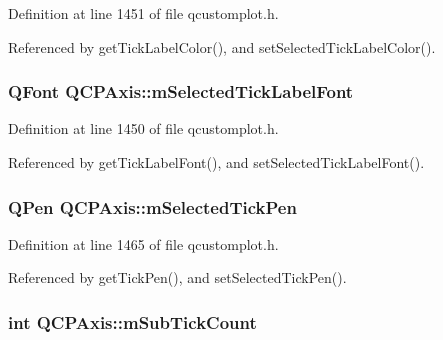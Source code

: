 Definition at line 1451 of file qcustomplot.\+h.



Referenced by get\+Tick\+Label\+Color(), and set\+Selected\+Tick\+Label\+Color().

\hypertarget{class_q_c_p_axis_a4f2e4919da9615dac612662c249b1119}{}
\subsubsection[{m\+Selected\+Tick\+Label\+Font}]{\setlength{\rightskip}{0pt plus 5cm}Q\+Font Q\+C\+P\+Axis\+::m\+Selected\+Tick\+Label\+Font\hspace{0.3cm}{\ttfamily [protected]}}\label{class_q_c_p_axis_a4f2e4919da9615dac612662c249b1119}


Definition at line 1450 of file qcustomplot.\+h.



Referenced by get\+Tick\+Label\+Font(), and set\+Selected\+Tick\+Label\+Font().

\hypertarget{class_q_c_p_axis_a9524593dbc75a5c5b29dbd1cb4b37df5}{}
\subsubsection[{m\+Selected\+Tick\+Pen}]{\setlength{\rightskip}{0pt plus 5cm}Q\+Pen Q\+C\+P\+Axis\+::m\+Selected\+Tick\+Pen\hspace{0.3cm}{\ttfamily [protected]}}\label{class_q_c_p_axis_a9524593dbc75a5c5b29dbd1cb4b37df5}


Definition at line 1465 of file qcustomplot.\+h.



Referenced by get\+Tick\+Pen(), and set\+Selected\+Tick\+Pen().

\hypertarget{class_q_c_p_axis_ad70198e6ae2801fc409bc3caec707da9}{}
\subsubsection[{m\+Sub\+Tick\+Count}]{\setlength{\rightskip}{0pt plus 5cm}int Q\+C\+P\+Axis\+::m\+Sub\+Tick\+Count\hspace{0.3cm}{\ttfamily [protected]}}\label{class_q_c_p_axis_ad70198e6ae2801fc409bc3caec707da9}


